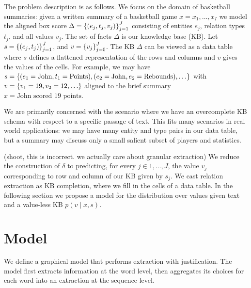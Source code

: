 \documentclass[12pt]{article}
\begin{document}
The problem description is as follows.
We focus on the domain of basketball summaries:
given a written summary of a basketball game $x = x_1, \ldots, x_{I}$
we model the aligned box score $\Delta = \left\{(e_j, t_j, v_j)\right\}_{j=1}^J$
consisting of entities $e_j$,
relation types $t_j$, and all values $v_j$.
The set of facts $\Delta$ is our knowledge base (KB).
Let $s = \left\{(e_j, t_j)\right\}_{j=1}^J$, and $v = \left\{v_j\right\}_{j=0}^J$.
The KB $\Delta$ can be viewed as a data table where
$s$ defines a flattened representation of the rows and columns and
$v$ gives the values of the cells.
For example, we may have
$
s = \left\{
    (e_1 = \textrm{John}, t_1 = \textrm{Points}),
    (e_2 = \textrm{John}, e_2 = \textrm{Rebounds}),
    \ldots
\right\}
$
with 
$ v = \left\{ v_1 = 19, v_2 = 12, \ldots \right\}$ 
aligned to the brief summary $x = \textrm{John scored 19 points}$.

We are primarily concerned with the scenario where we have an overcomplete KB schema with
respect to a specific passage of text.
This fits many scenarios in real world applications:
we may have many entity and type pairs in our data table,
but a summary may discuss only a small salient subset of players and statistics.

(shoot, this is incorrect. we actually care about granular extraction)
We reduce the construction of $\delta$ to predicting, for every $j\in 1,\ldots,J$,
the value $v_j$ corresponding to row and column of our KB given by $s_j$.
We cast relation extraction as KB completion, where we fill in the cells of a data table.
In the following section we propose a model for the distribution over
values given text and a value-less KB $p(v \mid x, s)$.

\section{Model}
We define a graphical model that performs extraction with justification. 
The model first extracts information at the word level,
then aggregates its choices for each word into an extraction at the sequence level.
\end{document}
